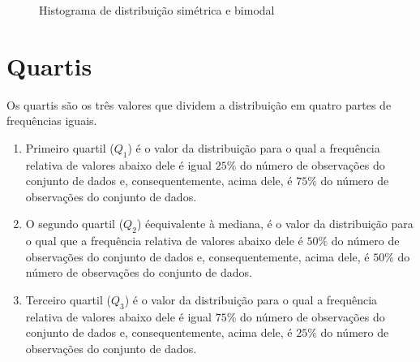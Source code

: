 \begin{figure}[H]
\centering
\capstart

\caption{Histograma de distribuição simétrica e bimodal}\label{\detokenize{PE104-1:id5}}\label{\detokenize{PE104-1:id20}}\end{figure}

\section{Quartis}

Os quartis são os três valores que dividem a distribuição em quatro partes de frequências iguais.

\begin{enumerate}
\item  Primeiro quartil (\(Q_1\)) é o valor da distribuição para o qual a frequência relativa de valores abaixo dele é igual $25\%$ do número de observações do conjunto de dados e, consequentemente, acima dele, é $75\%$ do número de observações do conjunto de dados.

\item O segundo quartil (\(Q_2\)) éequivalente à mediana, é o valor da distribuição para o qual que a frequência relativa de valores abaixo dele é  $50\%$ do número de observações do conjunto de dados e, consequentemente, acima dele, é $50\%$ do número de observações do conjunto de dados.

\item Terceiro quartil (\(Q_3\)) é o valor da distribuição para o qual a frequência relativa de valores abaixo dele é igual $75\%$ do número de observações do conjunto de dados e, consequentemente, acima dele, é $25\%$ do número de observações do conjunto de dados.
\end{enumerate}

